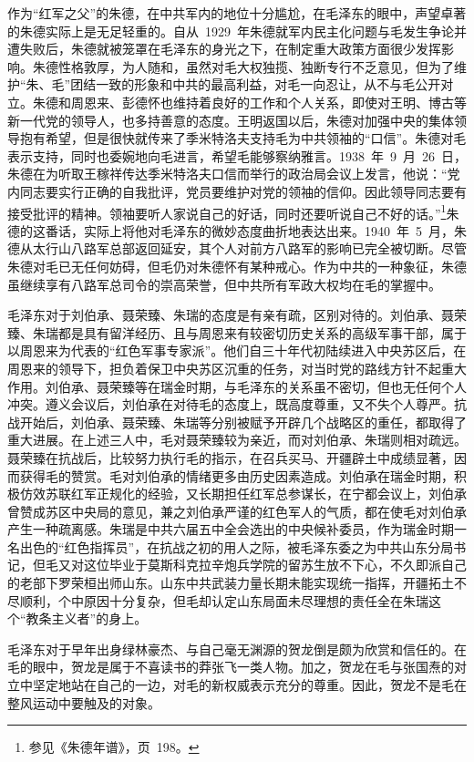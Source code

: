 作为“红军之父”的朱德，在中共军内的地位十分尴尬，在毛泽东的眼中，声望卓著的朱德实际上是无足轻重的。自从~1929~年朱德就军内民主化问题与毛发生争论并遭失败后，朱德就被笼罩在毛泽东的身光之下，在制定重大政策方面很少发挥影响。朱德性格敦厚，为人随和，虽然对毛大权独揽、独断专行不乏意见，但为了维护“朱、毛”团结一致的形象和中共的最高利益，对毛一向忍让，从不与毛公开对立。朱德和周恩来、彭德怀也维持着良好的工作和个人关系，即使对王明、博古等新一代党的领导人，也多持善意的态度。王明返国以后，朱德对加强中央的集体领导抱有希望，但是很快就传来了季米特洛夫支持毛为中共领袖的“口信”。朱德对毛表示支持，同时也委婉地向毛进言，希望毛能够察纳雅言。1938~年~9~月~26~日，朱德在为听取王稼祥传达季米特洛夫口信而举行的政治局会议上发言，他说：“党内同志要实行正确的自我批评，党员要维护对党的领袖的信仰。因此领导同志要有接受批评的精神。领袖要听人家说自己的好话，同时还要听说自己不好的话。”\footnote{参见《朱德年谱》，页~198。}朱德的这番话，实际上将他对毛泽东的微妙态度曲折地表达出来。1940~年~5~月，朱德从太行山八路军总部返回延安，其个人对前方八路军的影响已完全被切断。尽管朱德对毛已无任何妨碍，但毛仍对朱德怀有某种戒心。作为中共的一种象征，朱德虽继续享有八路军总司令的崇高荣誉，但中共所有军政大权均在毛的掌握中。

毛泽东对于刘伯承、聂荣臻、朱瑞的态度是有亲有疏，区别对待的。刘伯承、聂荣臻、朱瑞都是具有留洋经历、且与周恩来有较密切历史关系的高级军事干部，属于以周恩来为代表的“红色军事专家派”。他们自三十年代初陆续进入中央苏区后，在周恩来的领导下，担负着保卫中央苏区沉重的任务，对当时党的路线方针不起重大作用。刘伯承、聂荣臻等在瑞金时期，与毛泽东的关系虽不密切，但也无任何个人冲突。遵义会议后，刘伯承在对待毛的态度上，既高度尊重，又不失个人尊严。抗战开始后，刘伯承、聂荣臻、朱瑞等分别被赋予开辟几个战略区的重任，都取得了重大进展。在上述三人中，毛对聂荣臻较为亲近，而对刘伯承、朱瑞则相对疏远。聂荣臻在抗战后，比较努力执行毛的指示，在召兵买马、开疆辟土中成绩显著，因而获得毛的赞赏。毛对刘伯承的情绪更多由历史因素造成。刘伯承在瑞金时期，积极仿效苏联红军正规化的经验，又长期担任红军总参谋长，在宁都会议上，刘伯承曾赞成苏区中央局的意见，兼之刘伯承严谨的红色军人的气质，都在使毛对刘伯承产生一种疏离感。朱瑞是中共六届五中全会选出的中央候补委员，作为瑞金时期一名出色的“红色指挥员”，在抗战之初的用人之际，被毛泽东委之为中共山东分局书记，但毛又对这位毕业于莫斯科克拉辛炮兵学院的留苏生放不下心，不久即派自己的老部下罗荣桓出师山东。山东中共武装力量长期未能实现统一指挥，开疆拓土不尽顺利，个中原因十分复杂，但毛却认定山东局面未尽理想的责任全在朱瑞这个“教条主义者”的身上。

毛泽东对于早年出身绿林豪杰、与自己毫无渊源的贺龙倒是颇为欣赏和信任的。在毛的眼中，贺龙是属于不喜读书的莽张飞一类人物。加之，贺龙在毛与张国焘的对立中坚定地站在自己的一边，对毛的新权威表示充分的尊重。因此，贺龙不是毛在整风运动中要触及的对象。

